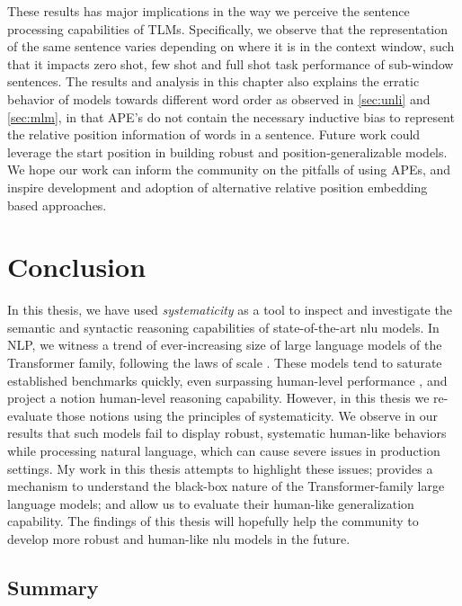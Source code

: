 \documentclass[letterpaper, 12pt]{report}
\begin{document}
These results has major implications in the way we perceive the sentence processing capabilities of TLMs.
Specifically, we observe that the representation of the same sentence varies depending on where it is in the context window, such that it impacts zero shot, few shot and full shot task performance of sub-window sentences.
The results and analysis in this chapter also explains the erratic behavior of models towards different word order as observed in \autoref{sec:unli} and \autoref{sec:mlm}, in that APE's do not contain the necessary inductive bias to represent the relative position information of words in a sentence.
Future work could leverage the start position in building robust and position-generalizable models.
We hope our work can inform the community on the pitfalls of using APEs, and inspire development and adoption of alternative relative position embedding based approaches.



\clearpage

\chapter{Conclusion}
\label{chap:conclusion}

In this thesis, we have used \textit{systematicity} as a tool to inspect and investigate the semantic and syntactic reasoning capabilities of state-of-the-art \acrshort{nlu} models. In NLP, we witness a trend of ever-increasing size of large language models of the Transformer family, following the laws of scale \citep{kaplan2020scaling}. These models tend to saturate established benchmarks quickly, even surpassing human-level performance \citep{kiela-etal-2021-dynabench}, and project a notion human-level reasoning capability. However, in this thesis we re-evaluate those notions using the principles of systematicity. We observe in our results that such models fail to display robust, systematic human-like behaviors while processing natural language, which can cause severe issues in production settings.  My work in this thesis attempts to highlight these issues; provides a mechanism to understand the black-box nature of the Transformer-family large language models; and allow us to evaluate their human-like generalization capability. The findings of this thesis will hopefully help the community to develop more robust and human-like \acrshort{nlu} models in the future.

\section{Summary}
\label{sec:conc_summary}
\end{document}
